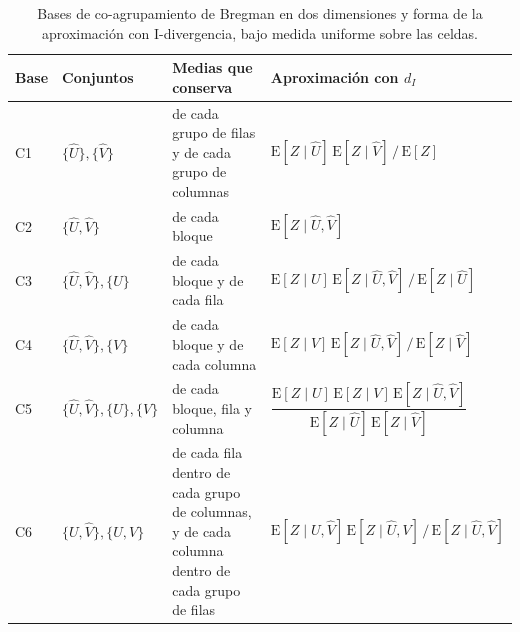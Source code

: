 \begin{table}[ht]
  \centering
  {\footnotesize
  \renewcommand{\arraystretch}{1.4}
  \begin{tabular}{@{}l p{} p{} p{}@{}}
    \toprule
    \textbf{Base} & \textbf{Conjuntos} & \textbf{Medias que conserva} & \textbf{Aproximación con $d_I$} \\
    \midrule
    C1 & $\{\hat{U}\}, \{\hat{V}\}$ & de cada grupo de filas y de cada grupo de columnas &
      $\mathrm{E}[Z \mid \hat{U}]\,\mathrm{E}[Z \mid \hat{V}] \,/\, \mathrm{E}[Z]$ \\
    \midrule
    C2 & $\{\hat{U}, \hat{V}\}$ & de cada bloque &
      $\mathrm{E}[Z \mid \hat{U},\hat{V}]$ \\
    \midrule
    C3 & $\{\hat{U}, \hat{V}\}, \{U\}$ & de cada bloque y de cada fila &
      $\mathrm{E}[Z \mid U]\,\mathrm{E}[Z \mid \hat{U},\hat{V}] \,/\, \mathrm{E}[Z \mid \hat{U}]$ \\
    \midrule
    C4 & $\{\hat{U}, \hat{V}\}, \{V\}$ & de cada bloque y de cada columna &
      $\mathrm{E}[Z \mid V]\,\mathrm{E}[Z \mid \hat{U},\hat{V}] \,/\, \mathrm{E}[Z \mid \hat{V}]$ \\
    \midrule
    C5 & $\{\hat{U}, \hat{V}\}, \{U\}, \{V\}$ & de cada bloque, fila y columna &
      $\dfrac{\mathrm{E}[Z \mid U]\,\mathrm{E}[Z \mid V]\,\mathrm{E}[Z \mid \hat{U},\hat{V}]}{\mathrm{E}[Z \mid \hat{U}]\,\mathrm{E}[Z \mid \hat{V}]}$ \\
    \midrule
    C6 & $\{U, \hat{V}\}, \{\hat{U}, V\}$ & de cada fila dentro de cada grupo de columnas, y de cada columna dentro de cada grupo de filas &
      $\mathrm{E}[Z \mid U,\hat{V}]\,\mathrm{E}[Z \mid \hat{U},V] \,/\, \mathrm{E}[Z \mid \hat{U},\hat{V}]$ \\
    \bottomrule
  \end{tabular}
  }
  \caption{Bases de co-agrupamiento de Bregman en dos dimensiones
  \citep{Banerjee2007} y forma de la aproximación con I-divergencia, bajo medida
  uniforme sobre las celdas.}
  \label{tab:bases}
\end{table}

